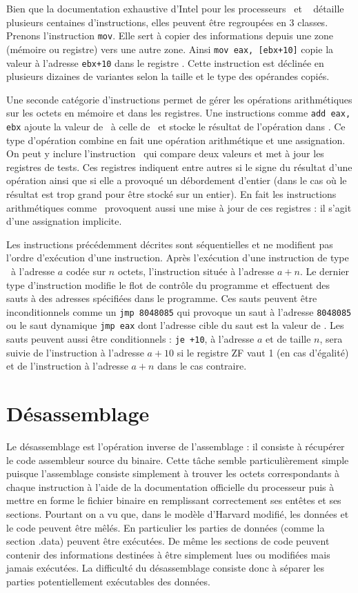 Bien que la documentation exhaustive d'Intel pour les processeurs \xq\ et \xs\ \cite{intel_vol2} détaille plusieurs centaines d'instructions, elles peuvent être regroupées en 3 classes.
Prenons l'instruction \texttt{mov}. Elle sert à copier des informations depuis une zone (mémoire ou registre) vers une autre zone.
Ainsi \texttt{mov eax, [ebx+10]} copie la valeur à l'adresse \texttt{ebx+10} dans le registre \eax. 
Cette instruction est déclinée en plusieurs dizaines de variantes selon la taille et le type des opérandes copiés.

Une seconde catégorie d'instructions permet de gérer les opérations arithmétiques sur les octets en mémoire et dans les registres.
Une instructions comme \texttt{add eax, ebx} ajoute la valeur de \ebx\ à celle de \eax\ et stocke le résultat de l'opération dans \eax.
Ce type d'opération combine en fait une opération arithmétique et une assignation. 
On peut y inclure l'instruction \cmp\ qui compare deux valeurs et met à jour les registres de tests. 
Ces registres indiquent entre autres si le signe du résultat d'une opération ainsi que si elle a provoqué un débordement d'entier (dans le cas où le résultat est trop grand pour être stocké sur un entier).
En fait les instructions arithmétiques comme \add\ provoquent aussi une mise à jour de ces registres : il s'agit d'une assignation implicite.

Les instructions précédemment décrites sont séquentielles et ne modifient pas l'ordre d'exécution d'une instruction. 
Après l'exécution d'une instruction de type \mov\ à l'adresse $a$ codée sur $n$ octets, l'instruction située à l'adresse $a+n$.
Le dernier type d'instruction modifie le flot de contrôle du programme et effectuent des sauts à des adresses spécifiées dans le programme.
Ces sauts peuvent être inconditionnels comme un \texttt{jmp 8048085} qui provoque un saut à l'adresse \texttt{8048085} ou le saut dynamique \texttt{jmp eax} dont l'adresse cible du saut est la valeur de \eax.
Les sauts peuvent aussi être conditionnels : \texttt{je +10}, à l'adresse $a$ et de taille $n$, sera suivie de l'instruction à l'adresse $a+10$ si le registre ZF vaut 1 (en cas d'égalité) et de l'instruction à l'adresse $a+n$ dans le cas contraire.


\section{Désassemblage}
Le désassemblage est l'opération inverse de l'assemblage : il consiste à récupérer le code assembleur source du binaire.
Cette tâche semble particulièrement simple puisque l'assemblage consiste simplement à trouver les octets correspondants à chaque instruction à l'aide de la documentation officielle du processeur puis à mettre en forme le fichier binaire en remplissant correctement ses entêtes et ses sections.
Pourtant on a vu que, dans le modèle d'Harvard modifié, les données et le code peuvent être mêlés. 
En particulier les parties de données (comme la section .data) peuvent être exécutées. 
De même les sections de code peuvent contenir des informations destinées à être simplement lues ou modifiées mais jamais exécutées.
La difficulté du désassemblage consiste donc à séparer les parties potentiellement exécutables des données.

